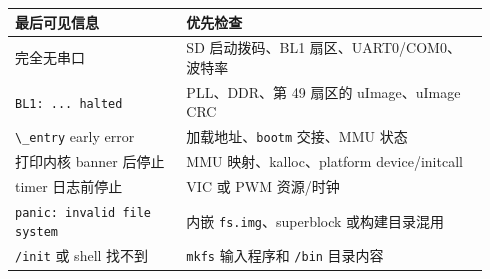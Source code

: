 {\def\LTcaptype{none} %
\begin{longtable}[]{@{}p{0.34\linewidth}p{0.60\linewidth}@{}}
\toprule\noalign{}
最后可见信息 & 优先检查 \\
\midrule\noalign{}
\endhead
\bottomrule\noalign{}
\endlastfoot
完全无串口 & SD 启动拨码、BL1 扇区、UART0/COM0、波特率 \\
\passthrough{\lstinline!BL1: ... halted!} &
PLL、DDR、第 49 扇区的 uImage、uImage CRC \\
\passthrough{\lstinline!\_entry!} early error &
加载地址、\passthrough{\lstinline!bootm!} 交接、MMU 状态 \\
打印内核 banner 后停止 & MMU 映射、kalloc、platform device/initcall \\
timer 日志前停止 & VIC 或 PWM 资源/时钟 \\
\passthrough{\lstinline!panic: invalid file system!} & 内嵌
\passthrough{\lstinline!fs.img!}、superblock 或构建目录混用 \\
\passthrough{\lstinline!/init!} 或 shell 找不到 &
\passthrough{\lstinline!mkfs!} 输入程序和 \passthrough{\lstinline!/bin!}
目录内容 \\
\end{longtable}
}
